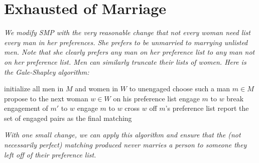 \documentclass[11pt, oneside]{article}   	%
\theoremstyle{definition}
\theoremstyle{remark}
\begin{document}
\cleardoublepage
\section{Exhausted of Marriage}
\textit{We modify SMP with the very reasonable change that not every woman need list every man in her preferences. She prefers to be unmarried to marrying unlisted men. Note that she clearly prefers any man on her
preference list to any man not on her preference list. Men can similarly truncate their lists of women. Here is the Gale-Shapley algorithm:}
  \begin{algorithmic}[1]
    \State initialize all men in $M$ and women in $W$ to unengaged
      \State choose such a man $m \in M$
      \State propose to the next woman $w \in W$ on his preference list
        \State engage $m$ to $w$
        \State break engagement of $m'$ to $w$
        \State engage $m$ to $w$
      \EndIf
      \State cross $w$ off $m$'s preference list
    \EndWhile
    \State report the set of engaged pairs as the final matching
  \EndProcedure
  \end{algorithmic}
\textit{With one small change, we can apply this algorithm and ensure that the (not necessarily perfect) matching produced never marries a person to someone they left off of their preference list.}
\end{document}
